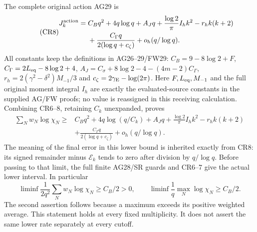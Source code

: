 \documentclass[11pt]{article}
\begin{document}
The complete original action AG29 \cite{CRAG} is
\begin{equation}\tag{CR8}\begin{aligned}
 J_k^{\rm action}={}&C_Bq^2+4q\log q+A_Jq
 +\frac{\log2}{\pi}I_hk^2-r_hk(k+2)\\
 &+\frac{C_\Gamma q}{2(\log q+c_\zeta)}+o_h(q/\log q).
\end{aligned}\end{equation}
All constants keep the definitions in AG26--29/FW29:
$C_B=9-8\log2+F$,
$C_\Gamma=2L_{\rm eq}-8\log2+4$,
$A_J=C_\sigma+8\log2-4-(4m-2)C_\Gamma$,
$r_h=2(\gamma^2-\delta^2)M_{-1}/3$ and
$c_\zeta=2\gamma_{\rm E}-\log(2\pi)$.
Here $F,L_{\rm eq},M_{-1}$ and the full original moment integral
$I_h$ are exactly the evaluated-source constants in the supplied
AG/FW proofs; no value is reassigned in this receiving calculation.
Combining CR6--8, retaining $C_k$ unexpanded, proves
\begin{equation}\tag{CR9}\boxed{\begin{aligned}
 \sum_Nw_N\log\chi_N\ge{}& C_Bq^2+4q\log(q/C_k)+A_Jq
 +\frac{\log2}{\pi}I_hk^2-r_hk(k+2)\\
 &+\frac{C_\Gamma q}{2(\log q+c_\zeta)}+o_h(q/\log q).
\end{aligned}}\end{equation}
The meaning of the final error in this lower bound is inherited
exactly from CR8: its signed remainder minus $\mathcal E_k$ tends
to zero after division by $q/\log q$. Before passing to that limit,
the full finite AG28/SR guards and CR6--7 give the actual lower
interval. In particular
\[
 \liminf\frac{1}{2q^2}\sum_Nw_N\log\chi_N\ge C_B/2>0,
 \qquad
 \liminf\frac1q\max_N\log\chi_N\ge C_B/2.
 \tag{CR10}
\]
The second assertion follows because a maximum exceeds its positive
weighted average. This statement holds at every fixed multiplicity.
It does not assert the same lower rate separately at every cutoff.
\end{document}
